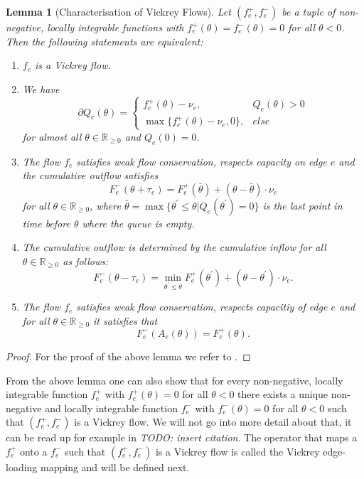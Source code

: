 \documentclass[reqno,openany]{amsbook}
\theoremstyle{definition}
\theoremstyle{plain}
\newtheorem{lemma}[definition]{Lemma}
\begin{document}
\begin{lemma}[Characterisation of Vickrey Flows]
Let $(f_e^+, f_e^-)$ be a tuple of non-negative, locally integrable functions with $f_e^+(\theta) = f_e^-(\theta) = 0$ for all $\theta < 0$. Then the following statements are equivalent:
\begin{enumerate}
	\item{$f_e$ is a Vickrey flow.}
	\item{We have \[\partial Q_e(\theta) = \begin{cases} f_e^+(\theta) - \nu_e,& Q_e(\theta) > 0 \\ \max\{f_e^+(\theta) - \nu_e
	, 0\},& else \end{cases}\] for almost all $\theta \in \mathbb{R}_{\geq 0}$ and $Q_e(0) = 0$.}
	\item{The flow $f_e$ satisfies weak flow conservation, respects capacity on edge $e$ and the cumulative outflow satisfies
	\[F_e^-(\theta + \tau_e) = F_e^+(\bar{\theta}) + (\theta - \bar{\theta}) \cdot \nu_e \]
	for all $\theta \in \mathbb{R}_{\geq 0}$, where $\bar{\theta} = \max\{\theta^{\prime} \leq \theta \vert Q_e(\theta^{\prime}
	) = 0\}$ is the last point in time before $\theta$ where the queue is empty.}
	\item{The cumulative outflow is determined by the cumulative inflow for all $\theta \in \mathbb{R}_{\geq 0}$ as follows:
	\[F_e^-(\theta - \tau_e) = \min_{\theta^{\prime} \leq \theta} F_e^+(\theta^{\prime}) + (\theta - \theta^{\prime}) \cdot 
	\nu_e.\]}
	\item{The flow $f_e$ satisfies weak flow conservation, respects capacitiy of edge $e$ and for all $\theta \in \mathbb{R}_{\geq 
	0}$ it satisfies that \[F_e^-(A_e(\theta)) = F_e^+(\theta). \]}
\end{enumerate}
\end{lemma}

\begin{proof}
For the proof of the above lemma we refer to \cite[Proposition 3.19]{GRA1}.
\end{proof}

From the above lemma one can also show that for every non-negative, locally integrable function $f_e^+$ with $f_e^+(\theta) = 0$ for all $\theta < 0$ there exists a unique non-negative and locally integrable function $f_e^-$ with $f_e^-(\theta) = 0$ for all $\theta < 0$ such that $(f_e^+, f_e^-)$ is a Vickrey flow. We will not go into more detail about that, it can be read up for example in \emph{TODO: insert citation}. The operator that maps a $f_e^+$ onto a $f_e^-$ such that $(f_e^+, f_e^-)$ is a Vickrey flow is called the Vickrey edge-loading mapping and will be defined next.
\end{document}
